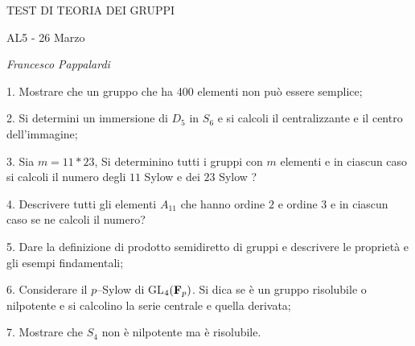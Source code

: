 \nopagenumbers

\centerline{TEST DI TEORIA DEI GRUPPI}
\centerline{AL5 - 26 Marzo}
\centerline{\it Francesco Pappalardi}

\item{1.} Mostrare che un gruppo che ha 400 elementi
non pu\`o essere semplice;
\bigskip

\item{2.} Si determini un immersione di $D_5$ in $S_6$ e si calcoli
il centralizzante e il centro dell'immagine;
\bigskip

\item{3.} Sia $m=11*23$, Si determinino tutti i gruppi con $m$ 
elementi e in ciascun caso si calcoli il numero degli $11$ Sylow
e dei $23$ Sylow ?
\bigskip

\item{4.} Descrivere tutti gli elementi $A_{11}$ che hanno ordine $2$
e ordine $3$ e in ciascun caso se ne calcoli il numero?
\bigskip

\item{5.} Dare la definizione di prodotto semidiretto di gruppi e 
descrivere le propriet\`a e gli esempi findamentali;
\bigskip

\item{6.} Considerare il $p$--Sylow di GL$_4({\bf F}_p)$. Si dica
se \`e un gruppo risolubile o nilpotente e si calcolino la serie
centrale e quella derivata;
\bigskip

\item{7.} Mostrare che $S_4$ non \`e nilpotente ma \`e risolubile. 


\bye



